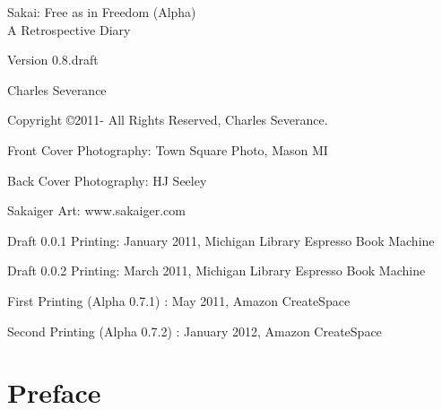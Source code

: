 \documentclass[12pt]{book}
\newcommand{\theversion}{0.8.draft}
\begin{document}
\frontmatter

\thispagestyle{empty}

\pagebreak
\thispagestyle{empty}

\begin{flushright}
\vspace*{2.0in}

\begin{spacing}{3}
{\huge Sakai: Free as in Freedom (Alpha)}\\
{\Large A Retrospective Diary}
\end{spacing}

\vspace{0.25in}

Version \theversion

\vspace{0.5in}


{\Large
Charles Severance\\
}


\vspace{2.25in}


\end{flushright}


\pagebreak
\thispagestyle{empty}

{\small
Copyright \copyright 2011- All Rights Reserved, Charles Severance.




Front Cover Photography: Town Square Photo, Mason MI

Back Cover Photography: HJ Seeley

Sakaiger Art: www.sakaiger.com

Draft 0.0.1 Printing: January 2011, Michigan Library Espresso Book Machine

Draft 0.0.2 Printing: March 2011, Michigan Library Espresso Book Machine

First Printing (Alpha 0.7.1) : May 2011, Amazon CreateSpace

Second Printing (Alpha 0.7.2) : January 2012, Amazon CreateSpace

} %

\chapter*{Preface}
\end{document}
